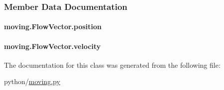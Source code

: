 \subsubsection{Member Data Documentation}
\hypertarget{classmoving_1_1FlowVector_a79d88d430e5b2e1d6aede942fa770348}{
\paragraph[{position}]{\setlength{\rightskip}{0pt plus 5cm}moving.\-Flow\-Vector.\-position}}\label{classmoving_1_1FlowVector_a79d88d430e5b2e1d6aede942fa770348}
\hypertarget{classmoving_1_1FlowVector_a91a16e07333e7e972c432d36324f2bce}{
\paragraph[{velocity}]{\setlength{\rightskip}{0pt plus 5cm}moving.\-Flow\-Vector.\-velocity}}\label{classmoving_1_1FlowVector_a91a16e07333e7e972c432d36324f2bce}


The documentation for this class was generated from the following file\-:\begin{DoxyCompactItemize}
\item 
python/\hyperlink{moving_8py}{moving.\-py}\end{DoxyCompactItemize}
